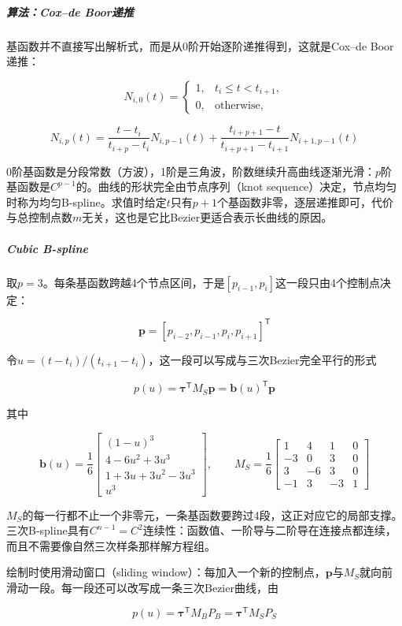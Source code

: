 \subparagraph{算法：Cox--de Boor递推}

基函数并不直接写出解析式，而是从0阶开始逐阶递推得到，这就是Cox--de Boor递推：

\[
N_{i,0}(t) = \begin{cases}1, & t_i\le t<t_{i+1},\\ 0, & \text{otherwise},\end{cases}
\]

\[
N_{i,p}(t) = \frac{t-t_i}{t_{i+p}-t_i}N_{i,p-1}(t) + \frac{t_{i+p+1}-t}{t_{i+p+1}-t_{i+1}}N_{i+1,p-1}(t)
\]

0阶基函数是分段常数（方波），1阶是三角波，阶数继续升高曲线逐渐光滑：$p$阶基函数是$C^{p-1}$的。曲线的形状完全由节点序列（knot sequence）决定，节点均匀时称为均匀B-spline。求值时给定$t$只有$p+1$个基函数非零，逐层递推即可，代价与总控制点数$m$无关，这也是它比Bezier更适合表示长曲线的原因。

\subparagraph{Cubic B-spline}

取$p=3$。每条基函数跨越4个节点区间，于是$[p_{i-1},p_i]$这一段只由4个控制点决定：

\[
\mathbf p = [p_{i-2},p_{i-1},p_i,p_{i+1}]^{\mathsf T}
\]

令$u = (t-t_i)/(t_{i+1}-t_i)$，这一段可以写成与三次Bezier完全平行的形式

\[
p(u) = \boldsymbol\tau^{\mathsf T}M_S\mathbf p = \mathbf b(u)^{\mathsf T}\mathbf p
\]

其中

\[
\mathbf b(u) = \frac16\begin{bmatrix}(1-u)^3\\ 4-6u^2+3u^3\\ 1+3u+3u^2-3u^3\\ u^3\end{bmatrix},\qquad
M_S = \frac16\begin{bmatrix}
    1 & 4 & 1 & 0\\
    -3 & 0 & 3 & 0\\
    3 & -6 & 3 & 0\\
    -1 & 3 & -3 & 1
\end{bmatrix}
\]

$M_S$的每一行都不止一个非零元，一条基函数要跨过4段，这正对应它的局部支撑。三次B-spline具有$C^{n-1}=C^2$连续性：函数值、一阶导与二阶导在连接点都连续，而且不需要像自然三次样条那样解方程组。

绘制时使用滑动窗口（sliding window）：每加入一个新的控制点，$\mathbf p$与$M_S$就向前滑动一段。每一段还可以改写成一条三次Bezier曲线，由

\[
p(u) = \boldsymbol\tau^{\mathsf T}M_BP_B = \boldsymbol\tau^{\mathsf T}M_SP_S
\]


